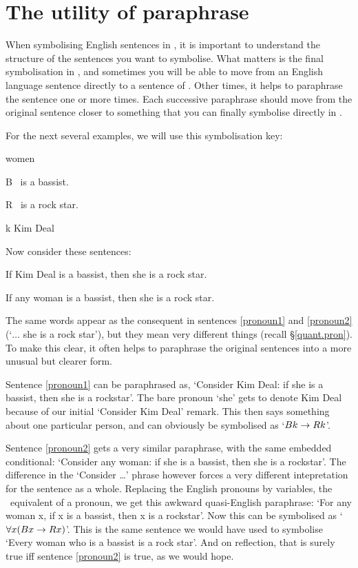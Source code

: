 \section{The utility of paraphrase}
When symbolising English sentences in \FOL, it is important to understand the structure of the sentences you want to symbolise. What matters is the final symbolisation in \FOL, and sometimes you will be able to move from an English language sentence directly to a sentence of \FOL. Other times, it helps to paraphrase the sentence one or more times. Each successive paraphrase should move from the original sentence closer to something that you can finally symbolise directly in \FOL.

For the next several examples, we will use this symbolisation key:
	\begin{ekey}
		\item[\text{domain}] women
		\item[B] \blank\ is a bassist.
		\item[R] \blank\ is a rock star.
		\item[k] Kim Deal
	\end{ekey}
Now consider these sentences:
	\begin{earg}
		\item[\ex{pronoun1}] If Kim Deal is a bassist, then she is a rock star.
		\item[\ex{pronoun2}] If any woman is a bassist, then she is a rock star.
	\end{earg}
The same words appear as the consequent in sentences \ref{pronoun1} and \ref{pronoun2} (`$…$ she is a rock star'), but they mean very different things (recall §\ref{quant.pron}). To make this clear, it often helps to paraphrase the original sentences into a more unusual but clearer form.

Sentence \ref{pronoun1} can be paraphrased as, `Consider Kim Deal: if she is a bassist, then she is a rockstar'. The bare pronoun `she' gets to denote Kim Deal because of our initial `Consider Kim Deal' remark. This then says something about one particular person, and can obviously be symbolised as `$Bk \rightarrow Rk$'.

Sentence \ref{pronoun2} gets a very similar paraphrase, with the same embedded conditional: `Consider any woman: if she is a bassist, then she is a rockstar'. The difference in the `Consider …' phrase however forces a very different intepretation for the sentence as a whole. Replacing the English pronouns by variables, the \FOL\ equivalent of a pronoun, we get this awkward quasi-English paraphrase: `For any woman x, if x is a bassist, then x is a rockstar'. Now this can be symbolised as `$\forall x (Bx \rightarrow Rx)$'. This is the same sentence we would have used to symbolise `Every woman who is a bassist is a rock star'. And on reflection, that is surely true iff sentence \ref{pronoun2} is true, as we would hope.

